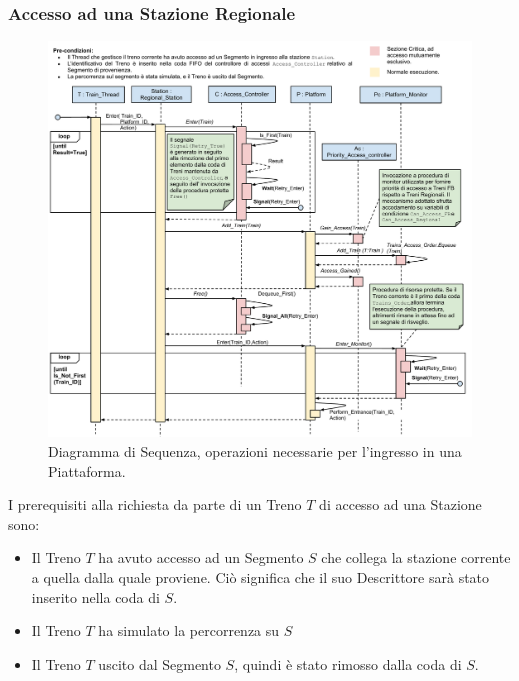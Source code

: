 		\subsubsection{Accesso ad una Stazione Regionale}\label{subsubsec:regional_station_access}
		
		\begin{figure}[htbp]
			\includegraphics[trim = 55mm 0mm 0mm 0mm,scale=0.53]{imgs/platform_access_Sequence_Diagram.pdf}
			\caption{\footnotesize{Diagramma di Sequenza, operazioni necessarie per l'ingresso in una Piattaforma.}}
			\label{fig:platform_access}
		\end{figure}
		
		I prerequisiti alla richiesta da parte di un Treno $T$ di accesso ad una Stazione sono:
		
			\begin{itemize}
				\item Il Treno $T$ ha avuto accesso ad un Segmento $S$ che collega la stazione corrente a quella dalla quale proviene. Ciò significa che il suo Descrittore sarà stato inserito nella coda  di $S$.
				\item Il Treno $T$ ha simulato la percorrenza su $S$ 
				\item Il Treno $T$ uscito dal Segmento $S$, quindi è stato rimosso dalla coda  di $S$.
			\end{itemize}
			

